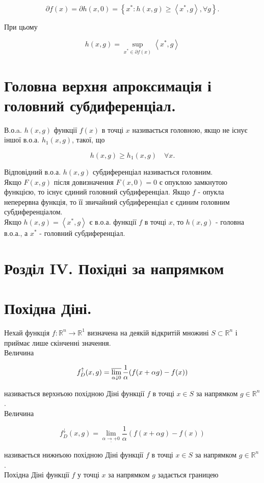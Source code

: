 \documentclass[10pt]{article}
\begin{document}
$$
\partial f(x)=\partial h(x, 0)=\left\{x^{*}: h(x, g) \geq\left\langle x^{*}, g\right\rangle, \forall g\right\} .
$$

При цьому

$$
h(x, g)=\sup _{x^{*} \in \partial f(x)}\left\langle x^{*}, g\right\rangle
$$

\section*{Головна верхня апроксимація і головний субдиференціал.}
В.о.a. $h(x, g)$ функції $f(x)$ в точці $x$ називається головною, якщо не існує іншої в.о.а. $h_{1}(x, g)$, такої, що

$$
h(x, g) \geq h_{1}(x, g) \quad \forall x .
$$

Відповідний в.о.а. $h(x, g)$ субдиференціал називається головним.\\
Якщо $F(x, g)$ після довизначення $F(x, 0)=0$ є опуклою замкнутою функцією, то існує єдиний головний субдиференціал. Якщо $f$ - опукла неперервна функція, то її звичайний субдиференціал є єдиним головним субдиференціалом.\\
Якщо $h(x, g)=\left\langle x^{*}, g\right\rangle$ є в.о.а. функції $f$ в точці $x$, то $h(x, g)$ - головна в.о.а., а $x^{*}$ - головний субдиференціал.

\section*{Розділ IV. Похідні за напрямком}
\section*{Похідна Діні.}
Нехай функція $f: \mathbb{R}^{n} \rightarrow \mathbb{R}^{1}$ визначена на деякій відкритій множині $S \subset \mathbb{R}^{n}$ і приймає лише скінченні значення.\\
Величина

$$
f_{D}^{\uparrow}(x, g)=\varlimsup_{\alpha \downarrow 0} \frac{1}{\alpha}(f(x+\alpha g)-f(x))
$$

називається верхнъою похідною Діні функції $f$ в точці $x \in S$ за напрямком $g \in \mathbb{R}^{n}$.\\
Величина

$$
f_{D}^{\downarrow}(x, g)=\lim _{\underline{\alpha \rightarrow+0}} \frac{1}{\alpha}(f(x+\alpha g)-f(x))
$$

називається нижнъою похідною Діні функції $f$ в точці $x \in S$ за напрямком $g \in \mathbb{R}^{n}$.\\
Похідна Діні функції $f$ у точці $x$ за напрямком $g$ задається границею
\end{document}
